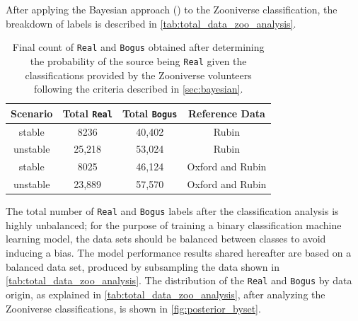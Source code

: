 \documentclass[DM,authoryear,toc]{lsstdoc}
\begin{document}
After applying the Bayesian approach (\citealt{marshall2016space}) to the Zooniverse classification, the breakdown of labels is described in \autoref{tab:total_data_zoo_analysis}.
\begin{table}[htb!]
    \centering
    \begin{tabular}{|c|c|c|c|}
    \hline
       \textbf{Scenario}  & \textbf{Total \texttt{Real}} & \textbf{Total \texttt{Bogus}} & \textbf{Reference Data} \\ \hline
       
        stable & 8236 & 40,402& Rubin\\ \hline
        unstable & 25,218& 53,024& Rubin\\ \hline
        \hline \hline
        stable & 8025 & 46,124 & Oxford and Rubin\\ \hline
        unstable & 23,889& 57,570& Oxford and Rubin\\ \hline
    \end{tabular}
    \caption{Final count of \texttt{Real} and \texttt{Bogus} obtained after determining the probability of the source being \texttt{Real} given the classifications provided by the Zooniverse volunteers following the criteria described in \autoref{sec:bayesian}.}
    \label{tab:total_data_zoo_analysis}
\end{table}

The total number of \texttt{Real} and \texttt{Bogus} labels after the classification analysis is highly unbalanced; for the purpose of training a binary classification machine learning model, the data sets should be balanced between classes to avoid inducing a bias. The model performance results shared hereafter are based on a balanced data set, produced by subsampling the data shown in \autoref{tab:total_data_zoo_analysis}. The distribution of the \texttt{Real} and \texttt{Bogus} by data origin, as explained in \autoref{tab:total_data_zoo_analysis}, after analyzing the Zooniverse classifications, is shown in \autoref{fig:posterior_byset}.
\end{document}
